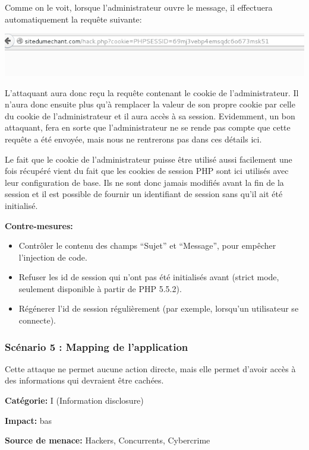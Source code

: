 \documentclass{article}
\begin{document}
Comme on le voit, lorsque l'administrateur ouvre le message, il
effectuera automatiquement la requête suivante:

\includegraphics[width=\textwidth]{images/xss6.png}

L'attaquant aura donc reçu la requête contenant le cookie de
l'administrateur. Il n'aura donc ensuite plus qu'à remplacer la valeur
de son propre cookie par celle du cookie de l'administrateur et il aura
accès à sa session. Evidemment, un bon attaquant, fera en sorte que
l'administrateur ne se rende pas compte que cette requête a été envoyée,
mais nous ne rentrerons pas dans ces détails ici.

Le fait que le cookie de l'administrateur puisse être utilisé aussi
facilement une fois récupéré vient du fait que les cookies de session
PHP sont ici utilisés avec leur configuration de base. Ils ne sont donc
jamais modifiés avant la fin de la session et il est possible de fournir
un identifiant de session sans qu'il ait été initialisé.

\textbf{Contre-mesures:}

\begin{itemize}

\item
  Contrôler le contenu des champs ``Sujet'' et ``Message'', pour
  empêcher l'injection de code.
\item
  Refuser les id de session qui n'ont pas été initialisés avant (strict
  mode, seulement disponible à partir de PHP 5.5.2).
\item
  Régénerer l'id de session régulièrement (par exemple, lorsqu'un
  utilisateur se connecte).
\end{itemize}

\subsubsection{Scénario 5 : Mapping de l'application}

Cette attaque ne permet aucune action directe, mais elle permet d'avoir
accès à des informations qui devraient être cachées.

\textbf{Catégorie:} I (Information disclosure)

\textbf{Impact:} bas

\textbf{Source de menace:} Hackers, Concurrents, Cybercrime
\end{document}
